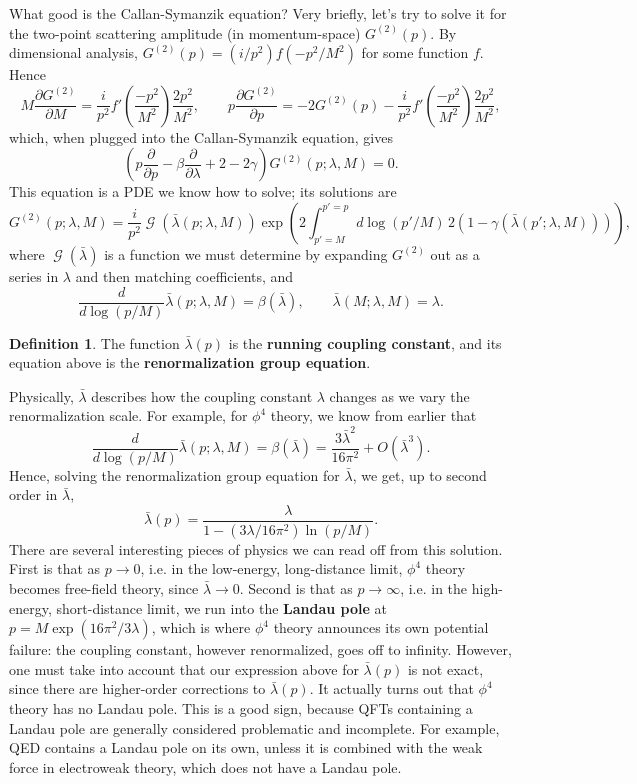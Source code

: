 \documentclass{report}
\theoremstyle{plain}
\theoremstyle{definition}
\newtheorem{definition}[theorem]{Definition}
\theoremstyle{remark}
\DeclareMathOperator{\cG}{\mathcal{G}}
\begin{document}
What good is the Callan-Symanzik equation? Very briefly, let's try to
solve it for the two-point scattering amplitude (in momentum-space)
$G^{(2)}(p)$. By dimensional analysis,
$G^{(2)}(p) = (i/p^2)f(-p^2/M^2)$ for some function $f$. Hence
$$ M\frac{\partial G^{(2)}}{\partial M} = \frac{i}{p^2} f'\left(\frac{-p^2}{M^2}\right) \frac{2p^2}{M^2}, \qquad p\frac{\partial G^{(2)}}{\partial p} = -2G^{(2)}(p) - \frac{i}{p^2} f'\left(\frac{-p^2}{M^2}\right) \frac{2p^2}{M^2}, $$
which, when plugged into the Callan-Symanzik equation, gives
$$ \left(p\frac{\partial}{\partial p} - \beta \frac{\partial}{\partial \lambda} + 2 - 2\gamma\right)G^{(2)}(p; \lambda, M) = 0. $$
This equation is a PDE we know how to solve; its solutions are
$$ G^{(2)}(p; \lambda, M) = \frac{i}{p^2} \cG(\bar{\lambda}(p; \lambda, M)) \exp\left(2\int_{p'=M}^{p'=p} d\log(p'/M) \, 2(1 - \gamma(\bar{\lambda}(p';\lambda,M)))\right), $$
where $\cG(\bar{\lambda})$ is a function we must determine by
expanding $G^{(2)}$ out as a series in $\lambda$ and then matching
coefficients, and
$$ \frac{d}{d \log(p/M)} \bar{\lambda}(p; \lambda,M) = \beta(\bar{\lambda}), \qquad \bar{\lambda}(M; \lambda,M) = \lambda. $$

\begin{definition}
  The function $\bar{\lambda}(p)$ is the {\bf running coupling
    constant}, and its equation above is the {\bf renormalization
    group equation}.
\end{definition}

Physically, $\bar{\lambda}$ describes how the coupling constant
$\lambda$ changes as we vary the renormalization scale. For example,
for $\phi^4$ theory, we know from earlier that
$$ \frac{d}{d\log(p/M)}\bar{\lambda}(p; \lambda,M) = \beta(\bar{\lambda}) = \frac{3\bar{\lambda}^2}{16\pi^2} + O(\bar{\lambda}^3). $$
Hence, solving the renormalization group equation for $\bar{\lambda}$,
we get, up to second order in $\bar{\lambda}$,
$$ \bar{\lambda}(p) = \frac{\lambda}{1 - (3\lambda / 16\pi^2) \ln(p/M)}. $$
There are several interesting pieces of physics we can read off from
this solution. First is that as $p \to 0$, i.e. in the low-energy,
long-distance limit, $\phi^4$ theory becomes free-field theory, since
$\bar{\lambda} \to 0$. Second is that as $p \to \infty$, i.e. in the
high-energy, short-distance limit, we run into the {\bf Landau pole}
at $p = M\exp(16\pi^2/3\lambda)$, which is where $\phi^4$ theory
announces its own potential failure: the coupling constant, however
renormalized, goes off to infinity. However, one must take into
account that our expression above for $\bar{\lambda}(p)$ is not exact,
since there are higher-order corrections to $\bar{\lambda}(p)$. It
actually turns out that $\phi^4$ theory has no Landau pole. This is a
good sign, because QFTs containing a Landau pole are generally
considered problematic and incomplete. For example, QED contains a
Landau pole on its own, unless it is combined with the weak force in
electroweak theory, which does not have a Landau pole.
\end{document}
